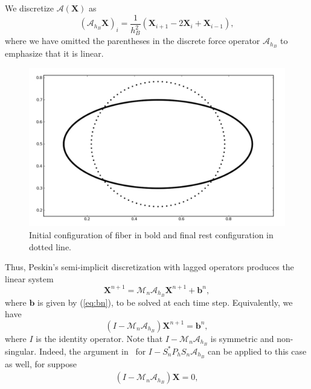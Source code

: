 \documentclass[preprint,12pt]{elsarticle}
\begin{document}
We discretize $\mathcal{A}(\mathbf{X})$ as
\begin{equation}
\left(\mathcal{A}_{h_B}\mathbf{X}\right)_i = \frac{1}{h_B^2}\left(\mathbf{X}_{i+1}-2\mathbf{X}_i+\mathbf{X}_{i-1}\right),
\label{eqn:LinearForce}
\end{equation}
where we have omitted the parentheses in the discrete force operator $\mathcal{A}_{h_B}$ to emphasize that it is linear.
\begin{figure}[!b]
  \begin{center}
    \includegraphics[bb=0in 0in 7.7in 4.8in,width=4.8in,clip]{Ellipse.pdf}
  \end{center}
  \caption{\small Initial configuration of fiber in bold and final rest configuration in dotted line.}
  \label{fig:Ellipse}
\end{figure}
Thus, Peskin's semi-implicit discretization with lagged operators  produces the linear system
\begin{equation}
\mathbf{X}^{n+1} = \mathcal{M}_n\mathcal{A}_{h_B} \mathbf{X}^{n+1} + \mathbf{b}^n,
\end{equation}
where $\mathbf{b}$ is given by (\ref{eq:bn}),  to be solved at each time step. Equivalently, we have
\begin{equation}
(\mathit{I}- \mathcal{M}_n\mathcal{A}_{h_B}) \mathbf{X}^{n+1} = \mathbf{b}^n,
\label{eq:LinearSystem}
\end{equation}
where $\mathit{I}$ is the identity operator.
Note that $\mathit{I}- \mathcal{M}_n\mathcal{A}_{h_B}$ is symmetric and non-singular. Indeed, the argument in~\cite{TP92} for $\mathit{I}- S^*_n P_h S_n \mathcal{A}_{h_B}$ can be applied to this case as well, for suppose
\begin{align}
(\mathit{I}- \mathcal{M}_n\mathcal{A}_{h_B}) \mathbf{X} =0, \label{eq:homo}
\end{align}
\end{document}

